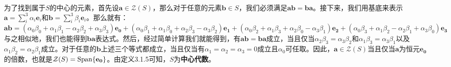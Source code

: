 \documentclass[mathserif,hyperref,UTF8,openany,b5paper]{ctexbook}
\begin{document}
为了找到属于$S$的中心的元素，首先设$\mathbf{a}\in\mathcal{Z}(S)$，那么对于任意的元素$\mathbf{b}\in S$，我们必须满足$\mathbf{ab=ba}$。接下来，我们用基底来表示$\mathbf{a}=\sum^3_{i}\alpha_i\mathbf{e}_i$和$\mathbf{b}=\sum^3_{i}\beta_i\mathbf{e}_i$。那么就有：
$\mathbf{ab}=(\alpha_0\beta_0+\alpha_1\beta_1-\alpha_2\beta_2+\alpha_3\beta_3)\mathbf{e_0}
    +(\alpha_0\beta_1+\alpha_1\beta_0+\alpha_2\beta_3-\alpha_3\beta_2)\mathbf{e_1}
    +(\alpha_0\beta_2+\alpha_1\beta_3+\alpha_2\beta_0-\alpha_3\beta_1)\mathbf{e_2}
    +(\alpha_0\beta_3+\alpha_1\beta_2-\alpha_2\beta_1+\alpha_3\beta_0)\mathbf{e_3}$
与之相似地，我们也能得到$\mathbf{ba}$表达式。然后，经过简单计算我们就能得到，有$\mathbf{ab=ba}$成立，当且仅当$\alpha_2\beta_3=\alpha_3\beta_2$和$\alpha_1\beta_3=\alpha_3\beta_1$以及$\alpha_1\beta_2=\alpha_2\beta_1$成立。对于任意的$\mathbf{b}$上述三个等式都成立，当且仅当有$\alpha_1=\alpha_2=\alpha_3=0$成立且$\alpha_0$可任取。因此，$\mathbf{a}\in\mathcal{Z}(S)$当且仅当$\mathbf{a}$为恒元$\mathbf{e_0}$的倍数，也就是$\mathcal{Z}(S)=\rm{Span}\{\mathbf{e_0}\}$。由定义3.1.5可知，$S$为\textbf{中心代数}。
\end{document}
